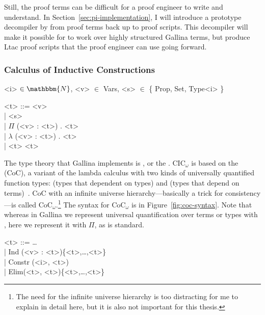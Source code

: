 Still, the proof terms can be difficult for a proof engineer to write and understand.
In Section~\ref{sec:pi-implementation}, I will introduce a prototype decompiler by  from proof terms back up to proof scripts.
This decompiler will make it possible for \sysnamelong to work over highly structured Gallina terms,
but produce Ltac proof scripts that the proof engineer can use going forward.

\subsubsection{Calculus of Inductive Constructions}
\label{sec:cic}

\begin{figure*}
\small
\begin{grammar}
<i> $\in \mathbbm{N}$, <v> $\in$ Vars, <s> $\in$ \{ Prop, Set, Type<i> \}

<t> ::= <v>\\
| <s> \\
| $\Pi$ (<v> : <t>) . <t>\\
| $\lambda$ (<v> : <t>) . <t>\\
|  <t> <t>
\end{grammar}
\caption{Syntax for CoC$_\omega$ with (from top to bottom) variables, sorts, function types, functions, and application.}
\label{fig:coc-syntax}
\end{figure*}

The type theory that Gallina implements is , or the .
CIC$_{\omega}$ is based on the  (CoC), a variant of the lambda calculus with two kinds of universally quantified function types:  (types that dependent on types) and  (types that depend on terms)~\cite{coquand:inria-00076024}.
CoC with an infinite universe hierarchy---basically a trick for consistency---is 
called CoC$_{\omega}$.\footnote{The need for the infinite universe hierarchy is too distracting for me to explain in detail here, but it is also not important for this thesis.}
The syntax for CoC$_{\omega}$ is in Figure~\ref{fig:coc-syntax}.
Note that whereas in Gallina we represent universal quantification over terms or types with \ltacforall, here we represent it with $\Pi$, as is standard.

\begin{figure*}
\small
\begin{grammar}
<t> ::= \ldots\\
| Ind (<v> : <t>)\{<t>,\ldots,<t>\} \\
| Constr (<i>, <t>)\\
| Elim(<t>, <t>)\{<t>,\ldots,<t>\}
\end{grammar}
\caption{CIC$_\omega$ is CoC$_\omega$ with , inductive , and .}
\label{fig:cic-syntax}
\end{figure*}

